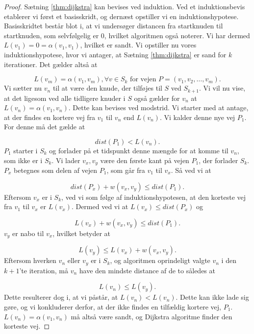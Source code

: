 \begin{proof}
Sætning \ref{thm:dijkstra} kan bevises ved induktion. Ved et induktionsbevis etablerer vi først et basisskridt, og dernæst opstiller vi en induktionshypotese. Basisskridtet består blot i, at vi undersøger distancen fra startknuden til startknuden, som selvfølgelig er 0, hvilket algoritmen også noterer. Vi har dermed $L(v_1)=0= \alpha(v_1,v_1)$, hvilket er sandt.
Vi opstiller nu vores induktionshypotese, hvor vi antager, at Sætning \ref{thm:dijkstra} er sand for $k$ iterationer. Det gælder altså at

\begin{equation}
L(v_m) = \alpha(v_1,v_m), \forall v \in S_k \textrm{ for vejen } P = (v_1, v_2, \dotsc, v_m).
\end{equation}
Vi sætter nu $v_{n}$ til at være den knude, der tilføjes til $S$ ved $S_{k+1}$. Vi vil nu vise, at det ligesom ved alle tidligere knuder i $S$ også gælder for $v_{n}$ at $L(v_n)=\alpha(v_1,v_n)$. Dette kan bevises ved modstrid. Vi starter med at antage, at der findes en kortere vej fra $v_1$ til $v_n$ end $L(v_n)$. Vi kalder denne nye vej $P_1$. For denne må det gælde at

\begin{equation}
dist(P_1)<L(v_n).
\end{equation}
$P_1$ starter i $S_k$ og forlader på et tidspunkt denne mængde for at komme til $v_n$, som ikke er i $S_k$. Vi lader $v_x,v_y$ være den første kant på vejen $P_1$, der forlader $S_k$. $P_x$ betegnes som delen af vejen $P_1$, som går fra $v_1$ til $v_x$. Så ved vi at

\begin{equation}
dist(P_x)+w(v_x,v_y) \leq dist(P_1).
\end{equation}
Eftersom $v_x$ er i $S_k$, ved vi som følge af induktionshypotesen, at den korteste vej fra $v_1$ til $v_x$ er $L(v_x)$. Dermed ved vi at $L(v_x) \leq dist(P_x)$ og

\begin{equation}
L(v_x) + w(v_x,v_y) \leq dist(P_1).
\end{equation}
$v_y$ er nabo til $v_x$, hvilket betyder at

\begin{equation}
L(v_y) \leq L(v_x) + w(v_x,v_y).
\end{equation}
Eftersom hverken $v_n$ eller $v_y$ er i $S_k$, og algoritmen oprindeligt valgte $v_n$ i den $k+1$'te iteration, må $v_n$ have den mindste distance af de to således at

\begin{equation}
L(v_n) \leq L(v_y).
\end{equation}
Dette resulterer dog i, at vi påstår, at $L(v_n) < L(v_n)$. Dette kan ikke lade sig gøre, og vi konkluderer derfor, at der ikke findes en tilfældig kortere vej, $P_1$. $L(v_n)=\alpha(v_1,v_n)$ må altså være sandt, og Dijkstra algoritme finder den korteste vej.
\end{proof}
